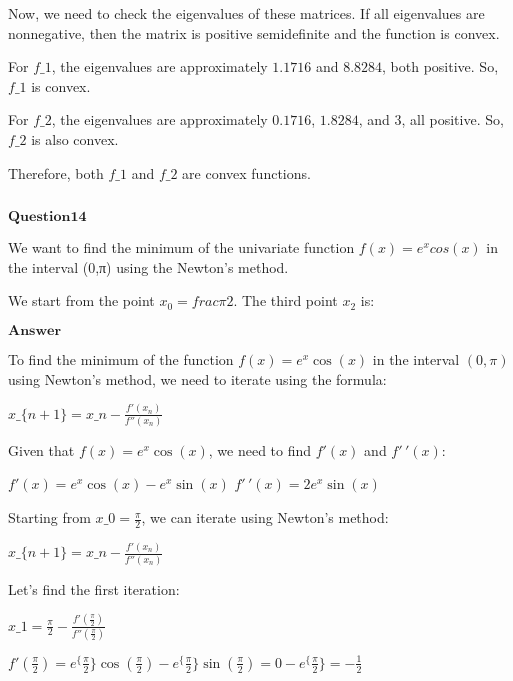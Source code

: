 \documentclass[11pt]{article}
\makeatletter
\newcommand{\boxspacing}{\kern\kvtcb@left@rule\kern\kvtcb@boxsep}
\newcommand{\prompt}[4]{
        {\ttfamily\llap{{\color{#2}[#3]:\hspace{3pt}#4}}\vspace{-\baselineskip}}
    }
\makeatother
\begin{document}
Now, we need to check the eigenvalues of these matrices. If all
eigenvalues are nonnegative, then the matrix is positive semidefinite
and the function is convex.

For $ f\_1 $, the eigenvalues are approximately $ 1.1716 $ and $
8.8284 $, both positive. So, $ f\_1 $ is convex.

For $ f\_2 $, the eigenvalues are approximately $ 0.1716 $, $
1.8284 $, and $ 3 $, all positive. So, $ f\_2 $ is also convex.

Therefore, both $ f\_1 $ and $ f\_2 $ are convex functions.

    \begin{tcolorbox}[breakable, size=fbox, boxrule=1pt, pad at break*=1mm,colback=cellbackground, colframe=cellborder]
\prompt{In}{incolor}{ }{\boxspacing}
\begin{Verbatim}[commandchars=\\\{\}]

\end{Verbatim}
\end{tcolorbox}

    $\textbf{Question14}$

We want to find the minimum of the univariate function
$f(x)=e^xcos(x)$ in the interval (0,π) using the Newton's method.

We start from the point $x_0=frac{π}{2}$. The third point $x_2$ is:

$\textbf{Answer}$

    To find the minimum of the function $ f(x) = e^x \cos(x) $ in the
interval $ (0, \pi) $ using Newton's method, we need to iterate using
the formula:

$ x\_\{n+1\} = x\_n - \frac{f'(x_n)}{f''(x_n)} $

Given that $ f(x) = e^x \cos(x) $, we need to find $ f'(x) $ and
$ f'\,'(x) $:

$ f'(x) = e^x \cos(x) - e^x \sin(x) $ $ f'\,'(x) = 2e^x
\sin(x) $

Starting from $ x\_0 = \frac{\pi}{2} $, we can iterate using Newton's
method:

$ x\_\{n+1\} = x\_n - \frac{f'(x_n)}{f''(x_n)} $

Let's find the first iteration:

$ x\_1 = \frac{\pi}{2} - \frac{f'(\frac{\pi}{2})}{f''(\frac{\pi}{2})}
$

$ f'(\frac{\pi}{2}) = e^\{\frac{\pi}{2}\} \cos(\frac{\pi}{2}) -
e^\{\frac{\pi}{2}\} \sin(\frac{\pi}{2}) = 0 - e^\{\frac{\pi}{2}\}
= -\frac{1}{2} $
\end{document}
